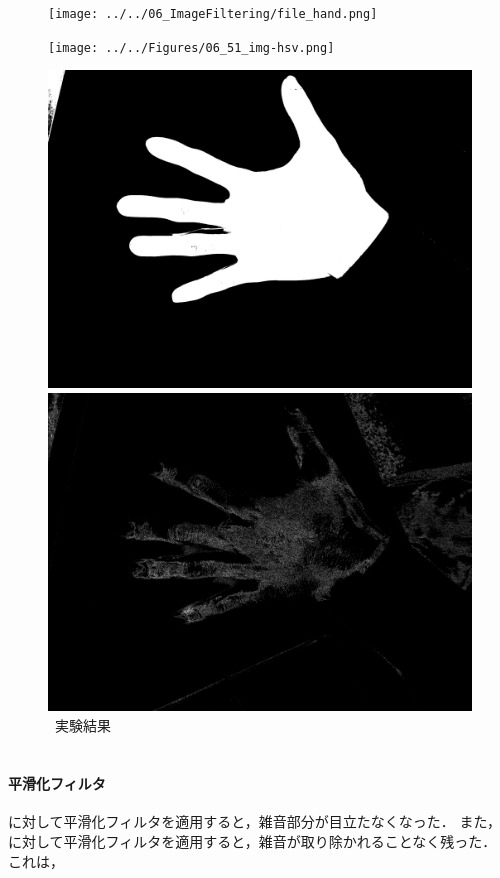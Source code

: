 \begin{figure}[ht]
    \centering
    \begin{minipage}[b]{.23\textwidth}
        \centering
        \texttt{[image: ../../06\_ImageFiltering/file\_hand.png]}
    \end{minipage}
    \begin{minipage}[b]{.23\textwidth}
        \centering
        \texttt{[image: ../../Figures/06\_51\_img-hsv.png]}
    \end{minipage}
    \begin{minipage}[b]{.23\textwidth}
        \centering
        \includegraphics[keepaspectratio,width=\textwidth]{../../Figures/06_52_scd.png}
    \end{minipage}
    \begin{minipage}[b]{.23\textwidth}
        \includegraphics[keepaspectratio,width=\textwidth]{../../Figures/06_53_hand.png}
    \end{minipage}
    \caption{\kadaibe\ 実験結果}
\end{figure}
\section{\consideration}
\paragraph{平滑化フィルタ}
\wgnimg に対して平滑化フィルタを適用すると，雑音部分が目立たなくなった．
また，\inimg に対して平滑化フィルタを適用すると，雑音が取り除かれることなく残った．
これは，